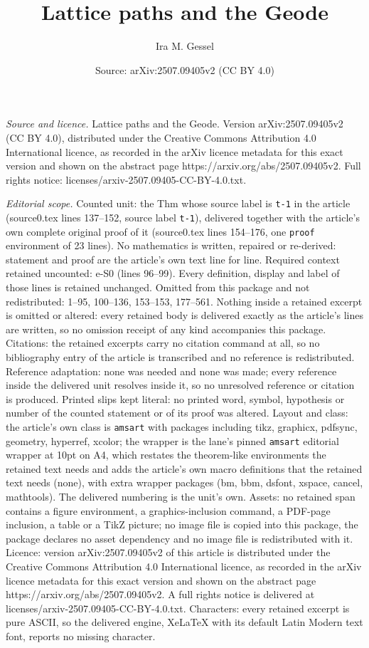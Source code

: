 \documentclass[10pt,a4paper]{amsart}
\title[Lattice paths and the Geode]{Lattice paths and the Geode}
\author{Ira M. Gessel}
\date{Source: arXiv:2507.09405v2 (CC BY 4.0)}
\begin{document}
\maketitle

\noindent\emph{Source and licence.} Lattice paths and the Geode. Version arXiv:2507.09405v2 (CC BY 4.0), distributed under the Creative Commons Attribution 4.0 International licence, as recorded in the arXiv licence metadata for this exact version and shown on the abstract page https://arxiv.org/abs/2507.09405v2. Full rights notice: licenses/arxiv-2507.09405-CC-BY-4.0.txt.\par\smallskip

\noindent\textit{Editorial scope.} Counted unit: the Thm whose source label is \texttt{t-1} in the article (source0.tex lines 137--152, source label \texttt{t-1}), delivered together with the article's own complete original proof of it (source0.tex lines 154--176, one \texttt{proof} environment of 23 lines). No mathematics is written, repaired or re-derived: statement and proof are the article's own text line for line. Required context retained uncounted: e-S0 (lines 96--99). Every definition, display and label of those lines is retained unchanged. Omitted from this package and not redistributed: 1--95, 100--136, 153--153, 177--561. Nothing inside a retained excerpt is omitted or altered: every retained body is delivered exactly as the article's lines are written, so no omission receipt of any kind accompanies this package. Citations: the retained excerpts carry no citation command at all, so no bibliography entry of the article is transcribed and no reference is redistributed. Reference adaptation: none was needed and none was made; every reference inside the delivered unit resolves inside it, so no unresolved reference or citation is produced. Printed slips kept literal: no printed word, symbol, hypothesis or number of the counted statement or of its proof was altered. Layout and class: the article's own class is \texttt{amsart} with packages including tikz, graphicx, pdfsync, geometry, hyperref, xcolor; the wrapper is the lane's pinned \texttt{amsart} editorial wrapper at 10pt on A4, which restates the theorem-like environments the retained text needs and adds the article's own macro definitions that the retained text needs (none), with extra wrapper packages (bm, bbm, dsfont, xspace, cancel, mathtools). The delivered numbering is the unit's own. Assets: no retained span contains a figure environment, a graphics-inclusion command, a PDF-page inclusion, a table or a TikZ picture; no image file is copied into this package, the package declares no asset dependency and no image file is redistributed with it. Licence: version arXiv:2507.09405v2 of this article is distributed under the Creative Commons Attribution 4.0 International licence, as recorded in the arXiv licence metadata for this exact version and shown on the abstract page https://arxiv.org/abs/2507.09405v2. A full rights notice is delivered at licenses/arxiv-2507.09405-CC-BY-4.0.txt. Characters: every retained excerpt is pure ASCII, so the delivered engine, XeLaTeX with its default Latin Modern text font, reports no missing character.
\end{document}
